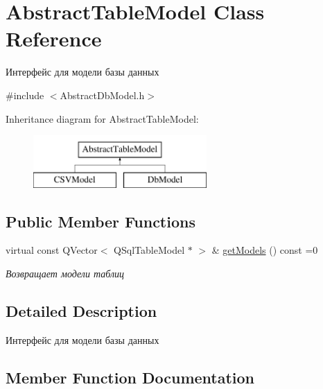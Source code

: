 \hypertarget{class_abstract_table_model}{}\section{Abstract\+Table\+Model Class Reference}
\label{class_abstract_table_model}


Интерфейс для модели базы данных  




{\ttfamily \#include $<$Abstract\+Db\+Model.\+h$>$}

Inheritance diagram for Abstract\+Table\+Model\+:\begin{figure}[H]
\begin{center}
\leavevmode
\includegraphics[height=2.000000cm]{class_abstract_table_model}
\end{center}
\end{figure}
\subsection*{Public Member Functions}
\begin{DoxyCompactItemize}
\item 
virtual const Q\+Vector$<$ Q\+Sql\+Table\+Model $\ast$ $>$ \& \mbox{\hyperlink{class_abstract_table_model_ac0e21bec862902ff88251c8880ec5014}{get\+Models}} () const =0
\begin{DoxyCompactList}\small\item\em Возвращает модели таблиц \end{DoxyCompactList}\end{DoxyCompactItemize}


\subsection{Detailed Description}
Интерфейс для модели базы данных 

\subsection{Member Function Documentation}
\mbox{\label{class_abstract_table_model_ac0e21bec862902ff88251c8880ec5014}} 

